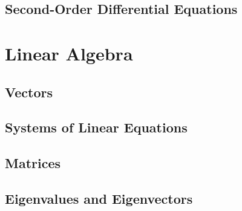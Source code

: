   \chapter{Second-Order Differential Equations}
    
    
    
    


\setcounter{chapter}{0}
\part{Linear Algebra}
  \chapter{Vectors}
    
    
    
    

  \chapter{Systems of Linear Equations}
    
    
    
    
    

  \chapter{Matrices}
    
    
    
    
    
    
    

  \chapter{Eigenvalues and Eigenvectors}
    
    
    
    
    
    

